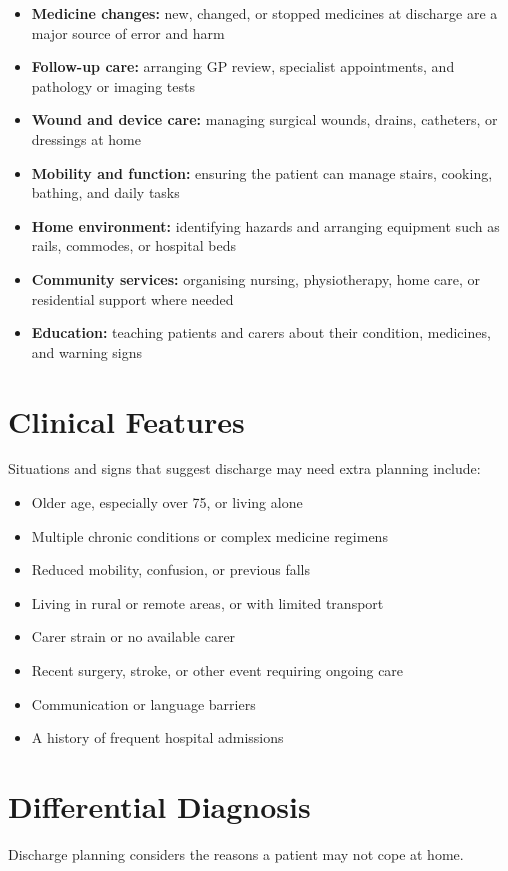 \begin{itemize}
    \item \textbf{Medicine changes:} new, changed, or stopped medicines at discharge are a major source of error and harm
    \item \textbf{Follow-up care:} arranging GP review, specialist appointments, and pathology or imaging tests
    \item \textbf{Wound and device care:} managing surgical wounds, drains, catheters, or dressings at home
    \item \textbf{Mobility and function:} ensuring the patient can manage stairs, cooking, bathing, and daily tasks
    \item \textbf{Home environment:} identifying hazards and arranging equipment such as rails, commodes, or hospital beds
    \item \textbf{Community services:} organising nursing, physiotherapy, home care, or residential support where needed
    \item \textbf{Education:} teaching patients and carers about their condition, medicines, and warning signs
\end{itemize}

\section*{Clinical Features}
Situations and signs that suggest discharge may need extra planning include:

\begin{itemize}
    \item Older age, especially over 75, or living alone
    \item Multiple chronic conditions or complex medicine regimens
    \item Reduced mobility, confusion, or previous falls
    \item Living in rural or remote areas, or with limited transport
    \item Carer strain or no available carer
    \item Recent surgery, stroke, or other event requiring ongoing care
    \item Communication or language barriers
    \item A history of frequent hospital admissions
\end{itemize}

\section*{Differential Diagnosis}
Discharge planning considers the reasons a patient may not cope at home.

